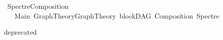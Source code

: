%
\begin{isabellebody}%
%
%
\isadelimtheory
%
\endisadelimtheory
%
\isatagtheory
{}\isamarkupfalse%
\ SpectreComposition\ \ \ \ \ \ \ \ \ \ \ \ \ \ \ \ \ \ \ \ \ \ \ \ \ \ \ \ \ \isanewline
\ \ \ Main\ Graph{\isacharunderscore}{\kern0pt}Theory{\isachardot}{\kern0pt}Graph{\isacharunderscore}{\kern0pt}Theory\ blockDAG\ Composition\ Spectre\isanewline
{}%
\endisatagtheory
{\isafoldtheory}%
%
\isadelimtheory
%
\endisadelimtheory
%
\begin{isamarkuptext}%
deprecated%
\end{isamarkuptext}\isamarkuptrue%
%
\isadelimtheory
%
\endisadelimtheory
%
\isatagtheory
{}\isamarkupfalse%
%
\endisatagtheory
{\isafoldtheory}%
%
\isadelimtheory
%
\endisadelimtheory
%
\end{isabellebody}%
\endinput

